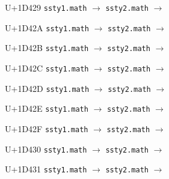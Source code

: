 \documentclass{article}
\begin{document}
\begin{substitutions}
\goodbreak

U+1D429  \linebreak
    \texttt{ssty1.math} $\to$  \linebreak
    \texttt{ssty2.math} $\to$  

\goodbreak

U+1D42A  \linebreak
    \texttt{ssty1.math} $\to$  \linebreak
    \texttt{ssty2.math} $\to$  

\goodbreak

U+1D42B  \linebreak
    \texttt{ssty1.math} $\to$  \linebreak
    \texttt{ssty2.math} $\to$  

\goodbreak

U+1D42C  \linebreak
    \texttt{ssty1.math} $\to$  \linebreak
    \texttt{ssty2.math} $\to$  

\goodbreak

U+1D42D  \linebreak
    \texttt{ssty1.math} $\to$  \linebreak
    \texttt{ssty2.math} $\to$  

\goodbreak

U+1D42E  \linebreak
    \texttt{ssty1.math} $\to$  \linebreak
    \texttt{ssty2.math} $\to$  

\goodbreak

U+1D42F  \linebreak
    \texttt{ssty1.math} $\to$  \linebreak
    \texttt{ssty2.math} $\to$  

\goodbreak

U+1D430  \linebreak
    \texttt{ssty1.math} $\to$  \linebreak
    \texttt{ssty2.math} $\to$  

\goodbreak

U+1D431  \linebreak
    \texttt{ssty1.math} $\to$  \linebreak
    \texttt{ssty2.math} $\to$  


\end{substitutions}
\end{document}
